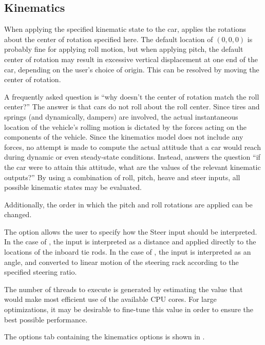 \subsection{Kinematics} \label{ssec:optionsKinematics}

When applying the specified kinematic state to the car, \vvase{} applies the rotations about the center of rotation specified here.  The default location of $\left(0, 0, 0\right)$ is probably fine for applying roll motion, but when applying pitch, the default center of rotation may result in excessive vertical displacement at one end of the car, depending on the user's choice of origin.  This can be resolved by moving the center of rotation.

A frequently asked question is ``why doesn't the center of rotation match the roll center?''  The answer is that cars do not roll about the roll center.  Since tires and springs (and dynamically, dampers) are involved, the actual instantaneous location of the vehicle's rolling motion is dictated by the forces acting on the components of the vehicle.  Since the kinematics model does not include any forces, no attempt is made to compute the actual attitude that a car would reach during dynamic or even steady-state conditions.  Instead, \vvase{} answers the question ``if the car were to attain this attitude, what are the values of the relevant kinematic outputs?''  By using a combination of roll, pitch, heave and steer inputs, all possible kinematic states may be evaluated.

Additionally, the order in which the pitch and roll rotations are applied can be changed.

The  option allows the user to specify how the Steer input should be interpreted.  In the case of , the input is interpreted as a distance and applied directly to the locations of the inboard tie rods.  In the case of , the input is interpreted as an angle, and converted to linear motion of the steering rack according to the specified steering ratio.

The number of threads to execute is generated by estimating the value that would make most efficient use of the available CPU cores.  For large optimizations, it may be desirable to fine-tune this value in order to ensure the best possible performance.

The options tab containing the kinematics options is shown in .

